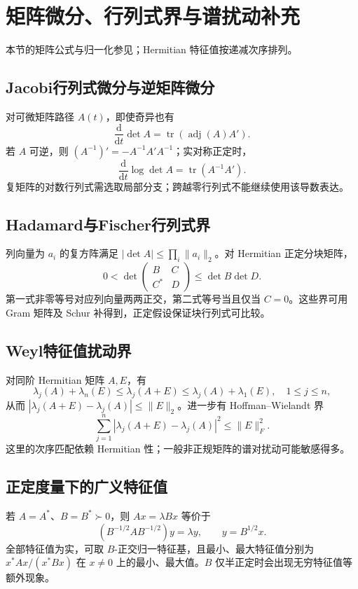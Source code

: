 \documentclass[../main.tex]{subfiles}
\begin{document}
\section{矩阵微分、行列式界与谱扰动补充}
本节的矩阵公式与归一化参见\cite{matrix}；Hermitian 特征值按递减次序排列。
\subsection{Jacobi行列式微分与逆矩阵微分}
对可微矩阵路径 $A(t)$，即使奇异也有
\[
\frac{\mathrm d}{\mathrm dt}\det A=\operatorname{tr}(\operatorname{adj}(A)A').
\]
若 $A$ 可逆，则 $(A^{-1})'=-A^{-1}A'A^{-1}$；实对称正定时，
\[
\frac{\mathrm d}{\mathrm dt}\log\det A=\operatorname{tr}(A^{-1}A').
\]
复矩阵的对数行列式需选取局部分支；跨越零行列式不能继续使用该导数表达。
\subsection{Hadamard与Fischer行列式界}
列向量为 $a_i$ 的复方阵满足 $|\det A|\le\prod_i\|a_i\|_2$。对 Hermitian 正定分块矩阵，
\[
0<\det\begin{pmatrix}B&C\\C^*&D\end{pmatrix}\le\det B\det D.
\]
第一式非零等号对应列向量两两正交，第二式等号当且仅当 $C=0$。这些界可用 Gram 矩阵及 Schur 补得到，正定假设保证块行列式可比较。
\subsection{Weyl特征值扰动界}
对同阶 Hermitian 矩阵 $A,E$，有
\[
\lambda_j(A)+\lambda_n(E)\le\lambda_j(A+E)
\le\lambda_j(A)+\lambda_1(E),\quad1\le j\le n,
\]
从而 $|\lambda_j(A+E)-\lambda_j(A)|\le\|E\|_2$。进一步有 Hoffman--Wielandt 界
\[
\sum_{j=1}^n|\lambda_j(A+E)-\lambda_j(A)|^2\le\|E\|_F^2.
\]
这里的次序匹配依赖 Hermitian 性；一般非正规矩阵的谱对扰动可能敏感得多。
\subsection{正定度量下的广义特征值}
若 $A=A^*$、$B=B^*\succ0$，则 $Ax=\lambda Bx$ 等价于
\[
(B^{-1/2}AB^{-1/2})y=\lambda y,\qquad y=B^{1/2}x.
\]
全部特征值为实，可取 $B$-正交归一特征基，且最小、最大特征值分别为 $x^*Ax/(x^*Bx)$ 在 $x\ne0$ 上的最小、最大值。$B$ 仅半正定时会出现无穷特征值等额外现象。
\clearpage
\end{document}
